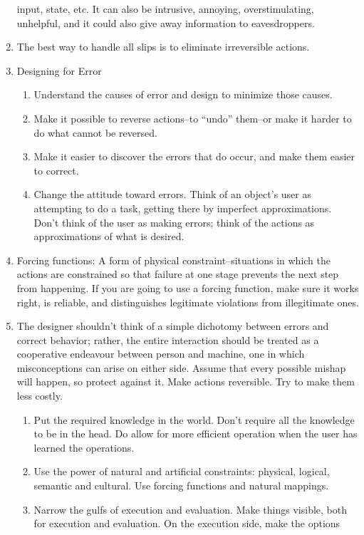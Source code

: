 \documentclass{designdoc}
\begin{document}
\begin{enumerate}
  input, state, etc. It can also be intrusive, annoying, overstimulating,
  unhelpful, and it could also give away information to eavesdroppers.
\item The best way to handle all slips is to eliminate irreversible actions.
\item Designing for Error
  \begin{enumerate}
  \item Understand the causes of error and design to minimize those causes.
  \item Make it possible to reverse actions--to ``undo'' them--or make it
    harder to do what cannot be reversed.
  \item Make it easier to discover the errors that do occur, and make them
    easier to correct.
    \item Change the attitude toward errors. Think of an object's user as
      attempting to do a task, getting there by imperfect approximations. Don't
      think of the user as making errors; think of the actions as
      approximations of what is desired.
  \end{enumerate}
\item Forcing functions: A form of physical constraint--situations in which the
  actions are constrained so that failure at one stage prevents the next step
  from happening. If you are going to use a forcing function, make sure it
  works right, is reliable, and distinguishes legitimate violations from
  illegitimate ones.
\item The designer shouldn't think of a simple dichotomy between errors and
  correct behavior; rather, the entire interaction should be treated as a
  cooperative endeavour between person and machine, one in which misconceptions
  can arise on either side. Assume that every possible mishap will happen, so
  protect against it. Make actions reversible. Try to make them less costly.
  \begin{enumerate}
  \item Put the required knowledge in the world. Don't require all the
    knowledge to be in the head. Do allow for more efficient operation when the
    user has learned the operations.
  \item Use the power of natural and artificial constraints: physical, logical,
    semantic and cultural. Use forcing functions and natural mappings.
  \item Narrow the gulfs of execution and evaluation. Make things visible, both
    for execution and evaluation. On the execution side, make the options

\end{enumerate}
\end{enumerate}
\end{document}

